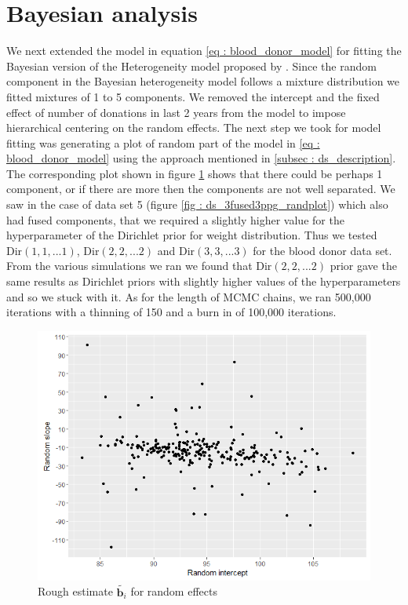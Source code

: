 \section{Bayesian analysis}
We next extended the model in equation \ref{eq : blood_donor_model} for fitting the Bayesian version of the Heterogeneity model proposed by \citet{verbeke_linear_1996}. Since the random component in the Bayesian heterogeneity model follows a mixture distribution we fitted mixtures of 1 to 5 components. We removed the intercept and the fixed effect of number of donations in last 2 years from the model to impose hierarchical centering on the random effects. The next step we took for model fitting was generating a plot of random part of the model in \ref{eq : blood_donor_model} using the approach mentioned in \ref{subsec : ds_description}. The corresponding plot shown in figure \ref{fig : rough_idea_blood_donor} shows that there could be perhaps 1 component, or if there are more then the components are not well separated. We saw in the case of data set 5 (figure \ref{fig : ds_3fused3ppg_randplot}) which also had fused components, that we required a slightly higher value for the hyperparameter of the Dirichlet prior for weight distribution. Thus we tested $\text{Dir}(1, 1,...1)$, $\text{Dir}(2, 2,...2)$ and $\text{Dir}(3, 3,...3)$ for the blood donor data set. From the various simulations we ran we found that $\text{Dir}(2, 2,...2)$ prior gave the same results as Dirichlet priors with slightly higher values of the hyperparameters and so we stuck with it. As for the length of MCMC chains, we ran 500,000 iterations with a thinning of 150 and a burn in of 100,000 iterations.\\

\begin{figure}
	\centering
	\includegraphics[scale=0.5]{mainmatter/chapter_6_blood_donor/rough_estimate_random_effects.png}
	\caption{Rough estimate $\tilde{\boldsymbol{b}_i}$ for random effects}
	\label{fig : rough_idea_blood_donor}
\end{figure}

